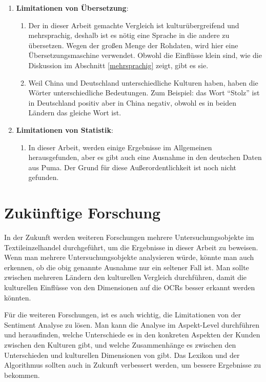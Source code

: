 \begin{enumerate}
	\item \textbf{Limitationen von Übersetzung}:
	\begin{enumerate}
		\item Der in dieser Arbeit gemachte Vergleich ist kulturübergreifend und mehrsprachig, deshalb ist es nötig eine Sprache in die andere zu übersetzen. Wegen der großen Menge der Rohdaten, wird hier eine Übersetzungsmaschine verwendet. Obwohl die Einflüsse klein sind, wie die Diskussion im Abschnitt \ref{mehrsprachig} zeigt, gibt es sie.
		\item Weil China und Deutschland unterschiedliche Kulturen haben, haben die Wörter unterschiedliche Bedeutungen. Zum Beispiel: das Wort ``Stolz'' ist in Deutschland positiv aber in China negativ, obwohl es in beiden Ländern das gleiche Wort ist.
	\end{enumerate}
	\item \textbf{Limitationen von Statistik}:
	\begin{enumerate}
		\item In dieser Arbeit, werden einige Ergebnisse im Allgemeinen herausgefunden, aber es gibt auch eine Ausnahme in den deutschen Daten aus Puma. Der Grund für diese Außerordentlichkeit ist noch nicht gefunden.  
	\end{enumerate}
\end{enumerate}
\section{Zukünftige Forschung}
In der Zukunft werden weiteren Forschungen mehrere Untersuchungsobjekte im Textileinzelhandel durchgeführt, um die Ergebnisse in dieser Arbeit zu beweisen. Wenn man mehrere Untersuchungsobjekte analysieren würde, könnte man auch erkennen, ob die obig genannte Ausnahme nur ein seltener Fall ist. Man sollte zwischen mehreren Ländern den kulturellen Vergleich durchführen, damit die kulturellen Einflüsse von den Dimensionen auf die \acl{OCRs} besser erkannt werden könnten. 

Für die weiteren Forschungen, ist es auch wichtig, die Limitationen von der Sentiment Analyse zu lösen. Man kann die Analyse im Aspekt-Level durchführen und herausfinden, welche Unterschiede es in den konkreten Aspekten der Kunden zwischen den Kulturen gibt, und welche Zusammenhänge es zwischen den Unterschieden und kulturellen Dimensionen von \citeauthor{hofstede2013interkulturelle} gibt. Das Lexikon und der Algorithmus sollten auch in Zukunft verbessert werden, um bessere Ergebnisse zu bekommen.

